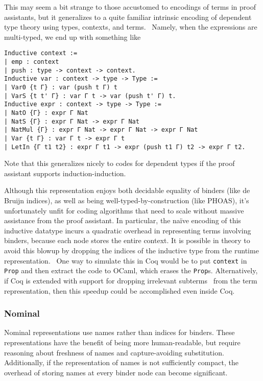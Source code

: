 This may seem a bit strange to those accustomed to encodings of terms in proof assistants, but it generalizes to a quite familiar intrinsic encoding of dependent type theory using types, contexts, and terms.~\cite{Strongly2012Benton}
Namely, when the expressions are multi-typed, we end up with something like
\begin{verbatim}
Inductive context :=
| emp : context
| push : type -> context -> context.
Inductive var : context -> type -> Type :=
| Var0 {t Γ} : var (push t Γ) t
| VarS {t t' Γ} : var Γ t -> var (push t' Γ) t.
Inductive expr : context -> type -> Type :=
| NatO {Γ} : expr Γ Nat
| NatS {Γ} : expr Γ Nat -> expr Γ Nat
| NatMul {Γ} : expr Γ Nat -> expr Γ Nat -> expr Γ Nat
| Var {t Γ} : var Γ t -> expr Γ t
| LetIn {Γ t1 t2} : expr Γ t1 -> expr (push t1 Γ) t2 -> expr Γ t2.
\end{verbatim}

Note that this generalizes nicely to codes for dependent types if the proof assistant supports induction-induction.

Although this representation enjoys both decidable equality of binders (like de Bruijn indices), as well as being well-typed-by-construction (like PHOAS), it's unfortunately unfit for coding algorithms that need to scale without massive assistance from the proof assistant.
In particular, the na\"ive encoding of this inductive datatype incurs a quadratic overhead in representing terms involving binders, because each node stores the entire context.
It is possible in theory to avoid this blowup by dropping the indices of the inductive type from the runtime representation.~\cite{Inductive2003Brady}
One way to simulate this in Coq would be to put \texttt{context} in \texttt{Prop} and then extract the code to OCaml, which erases the \texttt{Prop}s.
Alternatively, if Coq is extended with support for dropping irrelevant subterms~\cite{sprop} from the term representation, then this speedup could be accomplished even inside Coq.

\subsubsection{Nominal} \label{sec:binders:nominal}
Nominal representations use names rather than indices for binders.
These representations have the benefit of being more human-readable, but require reasoning about freshness of names and capture-avoiding substitution.
Additionally, if the representation of names is not sufficiently compact, the overhead of storing names at every binder node can become significant.

